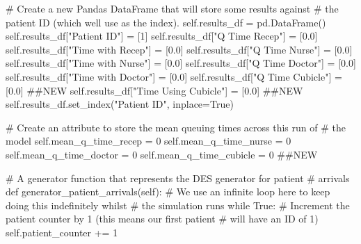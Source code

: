 \documentclass[
  letterpaper,
  DIV=11,
  numbers=noendperiod]{scrreprt}
\newenvironment{Shaded}{\begin{snugshade}}{\end{snugshade}}
\newcommand{\CommentTok}[1]{\textcolor[rgb]{0.37,0.37,0.37}{#1}}
\newcommand{\ControlFlowTok}[1]{\textcolor[rgb]{0.00,0.23,0.31}{#1}}
\newcommand{\DecValTok}[1]{\textcolor[rgb]{0.68,0.00,0.00}{#1}}
\newcommand{\FloatTok}[1]{\textcolor[rgb]{0.68,0.00,0.00}{#1}}
\newcommand{\KeywordTok}[1]{\textcolor[rgb]{0.00,0.23,0.31}{#1}}
\newcommand{\NormalTok}[1]{\textcolor[rgb]{0.00,0.23,0.31}{#1}}
\newcommand{\OperatorTok}[1]{\textcolor[rgb]{0.37,0.37,0.37}{#1}}
\newcommand{\StringTok}[1]{\textcolor[rgb]{0.13,0.47,0.30}{#1}}
\newcommand{\VariableTok}[1]{\textcolor[rgb]{0.07,0.07,0.07}{#1}}
\begin{document}
\begin{tcolorbox}
\begin{Shaded}
\begin{Highlighting}[]
        \CommentTok{\# Create a new Pandas DataFrame that will store some results against}
        \CommentTok{\# the patient ID (which we\textquotesingle{}ll use as the index).}
        \VariableTok{self}\NormalTok{.results\_df }\OperatorTok{=}\NormalTok{ pd.DataFrame()}
        \VariableTok{self}\NormalTok{.results\_df[}\StringTok{"Patient ID"}\NormalTok{] }\OperatorTok{=}\NormalTok{ [}\DecValTok{1}\NormalTok{]}
        \VariableTok{self}\NormalTok{.results\_df[}\StringTok{"Q Time Recep"}\NormalTok{] }\OperatorTok{=}\NormalTok{ [}\FloatTok{0.0}\NormalTok{]}
        \VariableTok{self}\NormalTok{.results\_df[}\StringTok{"Time with Recep"}\NormalTok{] }\OperatorTok{=}\NormalTok{ [}\FloatTok{0.0}\NormalTok{]}
        \VariableTok{self}\NormalTok{.results\_df[}\StringTok{"Q Time Nurse"}\NormalTok{] }\OperatorTok{=}\NormalTok{ [}\FloatTok{0.0}\NormalTok{]}
        \VariableTok{self}\NormalTok{.results\_df[}\StringTok{"Time with Nurse"}\NormalTok{] }\OperatorTok{=}\NormalTok{ [}\FloatTok{0.0}\NormalTok{]}
        \VariableTok{self}\NormalTok{.results\_df[}\StringTok{"Q Time Doctor"}\NormalTok{] }\OperatorTok{=}\NormalTok{ [}\FloatTok{0.0}\NormalTok{]}
        \VariableTok{self}\NormalTok{.results\_df[}\StringTok{"Time with Doctor"}\NormalTok{] }\OperatorTok{=}\NormalTok{ [}\FloatTok{0.0}\NormalTok{]}
        \VariableTok{self}\NormalTok{.results\_df[}\StringTok{"Q Time Cubicle"}\NormalTok{] }\OperatorTok{=}\NormalTok{ [}\FloatTok{0.0}\NormalTok{] }\CommentTok{\#\#NEW}
        \VariableTok{self}\NormalTok{.results\_df[}\StringTok{"Time Using Cubicle"}\NormalTok{] }\OperatorTok{=}\NormalTok{ [}\FloatTok{0.0}\NormalTok{] }\CommentTok{\#\#NEW}
        \VariableTok{self}\NormalTok{.results\_df.set\_index(}\StringTok{"Patient ID"}\NormalTok{, inplace}\OperatorTok{=}\VariableTok{True}\NormalTok{)}

        \CommentTok{\# Create an attribute to store the mean queuing times across this run of}
        \CommentTok{\# the model}
        \VariableTok{self}\NormalTok{.mean\_q\_time\_recep }\OperatorTok{=} \DecValTok{0}
        \VariableTok{self}\NormalTok{.mean\_q\_time\_nurse }\OperatorTok{=} \DecValTok{0}
        \VariableTok{self}\NormalTok{.mean\_q\_time\_doctor }\OperatorTok{=} \DecValTok{0}
        \VariableTok{self}\NormalTok{.mean\_q\_time\_cubicle }\OperatorTok{=} \DecValTok{0} \CommentTok{\#\#NEW}

    \CommentTok{\# A generator function that represents the DES generator for patient}
    \CommentTok{\# arrivals}
    \KeywordTok{def}\NormalTok{ generator\_patient\_arrivals(}\VariableTok{self}\NormalTok{):}
        \CommentTok{\# We use an infinite loop here to keep doing this indefinitely whilst}
        \CommentTok{\# the simulation runs}
        \ControlFlowTok{while} \VariableTok{True}\NormalTok{:}
            \CommentTok{\# Increment the patient counter by 1 (this means our first patient}
            \CommentTok{\# will have an ID of 1)}
            \VariableTok{self}\NormalTok{.patient\_counter }\OperatorTok{+=} \DecValTok{1}


\end{Highlighting}
\end{Shaded}
\end{tcolorbox}
\end{document}
